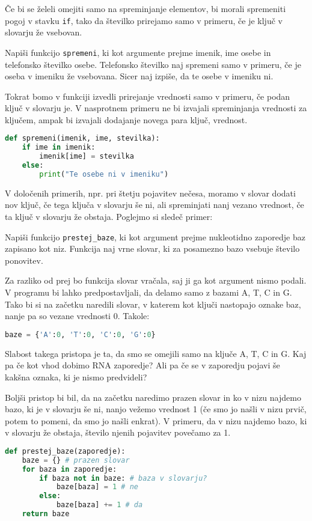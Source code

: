 Če bi se želeli omejiti samo na spreminjanje elementov, bi morali spremeniti pogoj v stavku \texttt{if}, tako da številko prirejamo samo v primeru, če je ključ v slovarju že vsebovan.
\begin{zgled}
Napiši funkcijo \texttt{spremeni}, ki kot argumente prejme imenik, ime osebe in telefonsko številko osebe. Telefonsko številko naj spremeni samo v primeru, če je oseba v imeniku že vsebovana. Sicer naj izpiše, da te osebe v imeniku ni.
\end{zgled}
\begin{resitev}
Tokrat bomo v funkciji izvedli prirejanje vrednosti samo v primeru, če podan ključ v slovarju je. V nasprotnem primeru ne bi izvajali spreminjanja vrednosti za ključem, ampak bi izvajali dodajanje novega para ključ, vrednost.
\begin{lstlisting}[language=Python]
def spremeni(imenik, ime, stevilka):
    if ime in imenik:
        imenik[ime] = stevilka
    else:
        print("Te osebe ni v imeniku")
\end{lstlisting}
\end{resitev}

V določenih primerih, npr. pri štetju pojavitev nečesa, moramo v slovar dodati nov ključ, če tega ključa v slovarju še ni, ali spreminjati nanj vezano vrednost, če ta ključ v slovarju že obstaja. Poglejmo si sledeč primer:

\begin{zgled}
Napiši funkcijo \texttt{prestej\_baze}, ki kot argument prejme nukleotidno zaporedje baz zapisano kot niz. Funkcija naj vrne slovar, ki za posamezno bazo vsebuje število ponovitev.
\end{zgled}
\begin{resitev}
Za razliko od prej bo funkcija slovar vračala, saj ji ga kot argument nismo podali. V programu bi lahko predpostavljali, da delamo samo z bazami A, T, C in G. Tako bi si na začetku naredili slovar, v katerem kot ključi nastopajo oznake baz, nanje pa so vezane vrednosti 0. Takole:
\begin{lstlisting}[language=Python]
baze = {'A':0, 'T':0, 'C':0, 'G':0}
\end{lstlisting}
Slabost takega pristopa je ta, da smo se omejili samo na ključe A, T, C in G. Kaj pa če kot vhod dobimo RNA zaporedje? Ali pa če se v zaporedju pojavi še kakšna oznaka, ki je nismo predvideli?

Boljši pristop bi bil, da na začetku naredimo prazen slovar in ko v nizu najdemo bazo, ki je v slovarju še ni, nanjo vežemo vrednost 1 (če smo jo našli v nizu prvič, potem to pomeni, da smo jo našli enkrat). V primeru, da v nizu najdemo bazo, ki v slovarju že obstaja, število njenih pojavitev povečamo za 1. 
\begin{lstlisting}[language=Python]
def prestej_baze(zaporedje):
    baze = {} # prazen slovar
    for baza in zaporedje:
        if baza not in baze: # baza v slovarju? 
            baze[baza] = 1 # ne
        else:
            baze[baza] += 1 # da
    return baze
\end{lstlisting}

\end{resitev}


